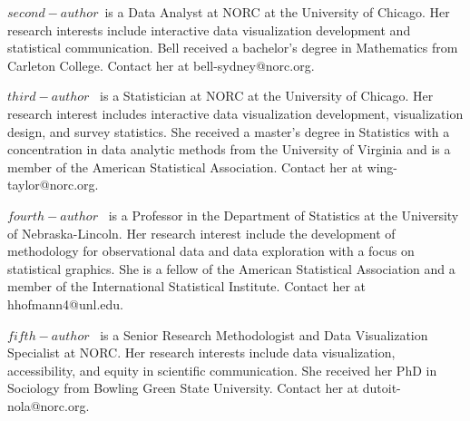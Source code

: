 \documentclass{IEEEcsmag}
\begin{document}
\begin{IEEEbiography}{$second-author$}{\,} is a Data Analyst at NORC at the University of Chicago.  Her research interests include interactive data visualization development and statistical communication. Bell received a bachelor's degree in Mathematics from Carleton College. Contact her  at bell-sydney@norc.org.\vspace*{8pt}
\end{IEEEbiography}

\begin{IEEEbiography}{$third-author$} {\,} is a Statistician at NORC at the University of Chicago. Her research interest includes interactive data visualization development, visualization design, and survey statistics. She received a master’s degree in Statistics with a concentration in data analytic methods from the University of Virginia and is a member of the American Statistical Association. Contact her at wing-taylor@norc.org.\vspace*{8pt}
\end{IEEEbiography}


\begin{IEEEbiography}{$fourth-author$} {\,} is a Professor in the Department of Statistics at the University of Nebraska-Lincoln.  Her research interest include the development of methodology for observational data and data exploration with a focus on statistical graphics. She is a fellow of the American Statistical Association and a member of the International Statistical Institute. Contact her at hhofmann4@unl.edu.
\end{IEEEbiography}


\begin{IEEEbiography}{$fifth-author$} {\,} is a Senior Research Methodologist and Data Visualization Specialist at NORC. Her research interests include data visualization, accessibility, and equity in scientific communication. She received her PhD in Sociology from Bowling Green State University. Contact her at dutoit-nola@norc.org.
\end{IEEEbiography}
\end{document}
